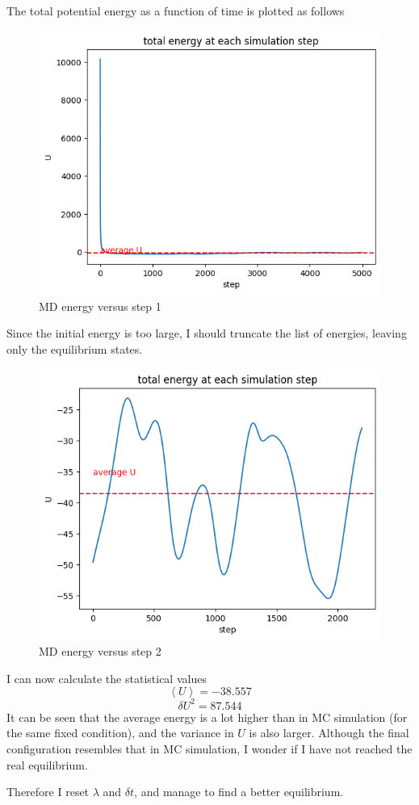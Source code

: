 \documentclass[letterpaper,12pt]{article}
\numberwithin{equation}{section}
\begin{document}
\begin{enumerate}[label=(\alph*)]
    The total potential energy as a function of time is plotted as follows
    \begin{figure}[H]
        \centering
        \includegraphics[width=.8\textwidth]{energy_to_time_md1.png}
        \caption{MD energy versus step 1}
    \end{figure}
    Since the initial energy is too large, I should truncate the list of energies, leaving only the equilibrium states. 
    \begin{figure}[H]
        \centering
        \includegraphics[width=.8\textwidth]{energy_to_time_md2.png}
        \caption{MD energy versus step 2}
    \end{figure}
    I can now calculate the statistical values 
    \begin{equation}
        \left\langle U\right\rangle=-38.557
    \end{equation}
    \begin{equation}
        \delta U^2=87.544
    \end{equation}
    It can be seen that the average energy is a lot higher than in MC simulation (for the same fixed condition), and the variance in $U$ is also larger. Although the final configuration resembles that in MC simulation, I wonder if I have not reached the real equilibrium.
    
    Therefore I reset $\lambda$ and $\delta t$, and manage to find a better equilibrium. 
\end{enumerate}
\end{document}
